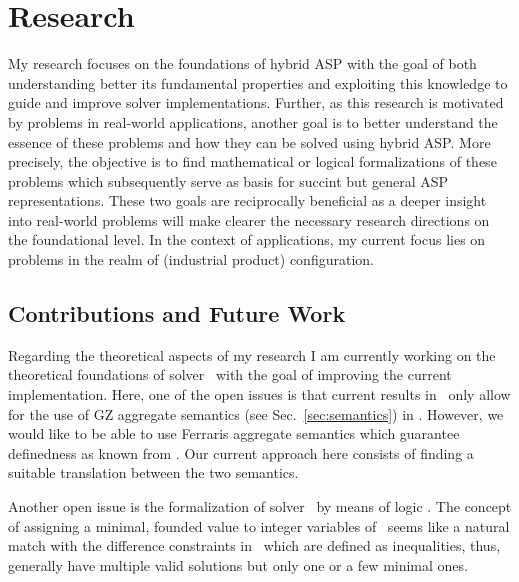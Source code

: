 \section{Research}\label{sec:research}

My research focuses on the foundations of hybrid ASP with the goal of both
understanding better its fundamental properties and
exploiting this knowledge to guide and improve solver implementations.
%
Further, as this research is motivated by problems in real-world applications,
another goal is to better understand the essence of these problems and how they can be solved using hybrid ASP.
%
More precisely, the objective is to find mathematical or logical formalizations of these problems which subsequently serve as basis for succint but general ASP representations.
%
These two goals are reciprocally beneficial as a deeper insight into real-world problems will make clearer the necessary research directions on the foundational level.
%
In the context of applications, my current focus lies on problems in the realm of (industrial product) configuration.

\subsection{Contributions and Future Work}
Regarding the theoretical aspects of my research I am currently working on the theoretical foundations of solver \fclingo\
with the goal of improving the current implementation.
%
Here, one of the open issues is that current results in \HTC\ only allow for the use of GZ aggregate semantics (see Sec.~\ref{sec:semantics}) in \fclingo.
%
However, we would like to be able to use Ferraris aggregate semantics which guarantee definedness as known from \clingo.
%
Our current approach here consists of finding a suitable translation between the two semantics.

Another open issue is the formalization of solver \clingodl\ by means of logic \HTLB.
%
The concept of assigning a minimal, founded value to integer variables of \HTLB\ seems like a natural match with
the difference constraints in \clingodl\ which are defined as inequalities, thus, generally have multiple valid solutions
but only one or a few minimal ones.
%
%

